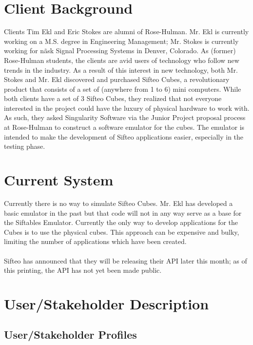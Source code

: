 \documentclass[12pt]{article}
\begin{document}
\section{Client Background}
Clients Tim Ekl and Eric Stokes are alumni of Rose-Hulman. Mr. Ekl is currently working on a M.S. degree in Engineering Management; Mr. Stokes is currently working for n\~ask Signal Processing Systems in Denver, Colorado. As (former) Rose-Hulman students, the clients are avid users of technology who follow new trends in the industry. As a result of this interest in new technology, both Mr. Stokes and Mr. Ekl discovered and purchased Sifteo Cubes, a revolutionary product that consists of a set of (anywhere from 1 to 6) mini computers. While both clients have a set of 3 Sifteo Cubes, they realized that not everyone interested in the project could have the luxury of physical hardware to work with. As such, they asked Singularity Software \- via the Junior Project proposal process at Rose-Hulman \- to construct a software emulator for the cubes. The emulator is intended to make the development of Sifteo applications easier, especially in the testing phase.

\section{Current System}
Currently there is no way to simulate Sifteo Cubes. Mr. Ekl has developed a basic emulator in the past but that code will not in any way serve as a base for the Siftables Emulator. Currently the only way to develop applications for the Cubes is to use the physical cubes. This approach can be expensive and bulky, limiting the number of applications which have been created.\\\\
Sifteo has announced that they will be releasing their API later this month; as of this printing, the API has not yet been made public.

\section{User/Stakeholder Description}

               \subsection{User/Stakeholder Profiles}
\end{document}
